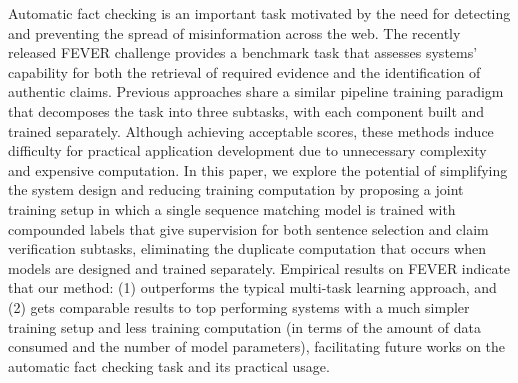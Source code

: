 Automatic fact checking is an important task motivated by the need for detecting and preventing the spread of misinformation across the web. The recently released FEVER challenge provides a benchmark task that assesses systems' capability for both the retrieval of required evidence and the identification of authentic claims. Previous approaches share a similar pipeline training paradigm that decomposes the task into three subtasks, with each component built and trained separately. Although achieving acceptable scores, these methods induce difficulty for practical application development due to unnecessary complexity and expensive computation. In this paper, we explore the potential of simplifying the system design and reducing training computation by proposing a joint training setup in which a single sequence matching model is trained with compounded labels that give supervision for both sentence selection and claim verification subtasks, eliminating the duplicate computation that occurs when models are designed and trained separately. Empirical results on FEVER indicate that our method: (1) outperforms the typical multi-task learning approach, and (2) gets comparable results to top performing systems with a much simpler training setup and less training computation (in terms of the amount of data consumed and the number of model parameters), facilitating future works on the automatic fact checking task and its practical usage.
